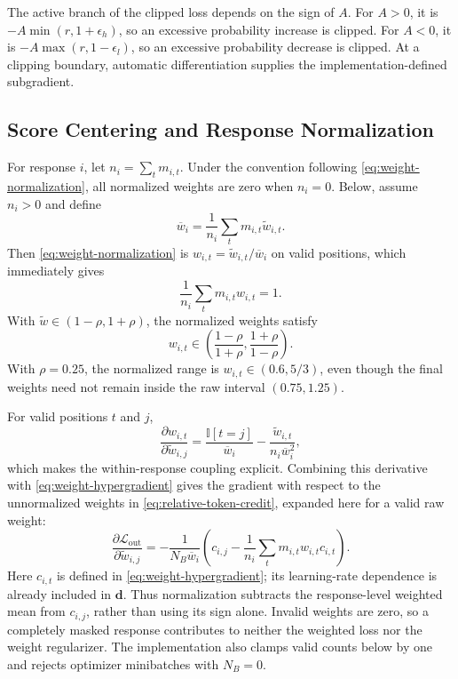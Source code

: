 \documentclass{article}
\theoremstyle{plain}
\theoremstyle{definition}
\theoremstyle{remark}
\begin{document}
The active branch of the clipped loss depends on the sign of \(A\). For \(A>0\), it is
\(-A\min(r,1+\epsilon_h)\), so an excessive probability increase is clipped. For \(A<0\), it is
\(-A\max(r,1-\epsilon_l)\), so an excessive probability decrease is clipped. At a clipping
boundary, automatic differentiation supplies the implementation-defined subgradient.

\subsection{Score Centering and Response Normalization}
\label{app:weight-normalization-math}

For response \(i\), let \(n_i=\sum_t m_{i,t}\). Under the convention following \cref{eq:weight-normalization}, all normalized weights are zero when \(n_i=0\). Below, assume \(n_i>0\) and define
\[
    \overline w_i=\frac{1}{n_i}\sum_t m_{i,t}\widetilde w_{i,t}.
\]
Then \cref{eq:weight-normalization} is \(w_{i,t}=\widetilde w_{i,t}/\overline w_i\) on valid
positions, which immediately gives
\[
    \frac{1}{n_i}\sum_t m_{i,t}w_{i,t}=1.
\]
With \(\widetilde w\in(1-\rho,1+\rho)\), the normalized weights satisfy
\[
    w_{i,t}\in
    \left(\frac{1-\rho}{1+\rho},\frac{1+\rho}{1-\rho}\right).
\]
With \(\rho=0.25\), the normalized range is \(w_{i,t}\in(0.6,5/3)\), even though the final
weights need not remain inside the raw interval \((0.75,1.25)\).

For valid positions \(t\) and \(j\),
\[
    \frac{\partial w_{i,t}}{\partial\widetilde w_{i,j}}
    =
    \frac{\mathbb I[t=j]}{\overline w_i}
    -
    \frac{\widetilde w_{i,t}}{n_i\overline w_i^2},
\]
which makes the within-response coupling explicit. Combining this derivative with
\cref{eq:weight-hypergradient} gives the gradient with respect to the unnormalized weights in
\cref{eq:relative-token-credit}, expanded here for a valid raw weight:
\[
    \frac{\partial\mathcal L_{\mathrm{out}}}{\partial\widetilde w_{i,j}}
    =-
    \frac{1}{N_B\overline w_i}
    \left(
        c_{i,j}-\frac{1}{n_i}\sum_t m_{i,t}w_{i,t}c_{i,t}
    \right).
\]
Here \(c_{i,t}\) is defined in \cref{eq:weight-hypergradient}; its
learning-rate dependence is already included in \(\boldsymbol d\). Thus normalization subtracts
the response-level weighted mean from \(c_{i,j}\), rather than using its sign alone.
Invalid weights are zero, so a completely masked response contributes to
neither the weighted loss nor the weight regularizer. The implementation also clamps valid counts
below by one and rejects optimizer minibatches with \(N_B=0\).
\end{document}
